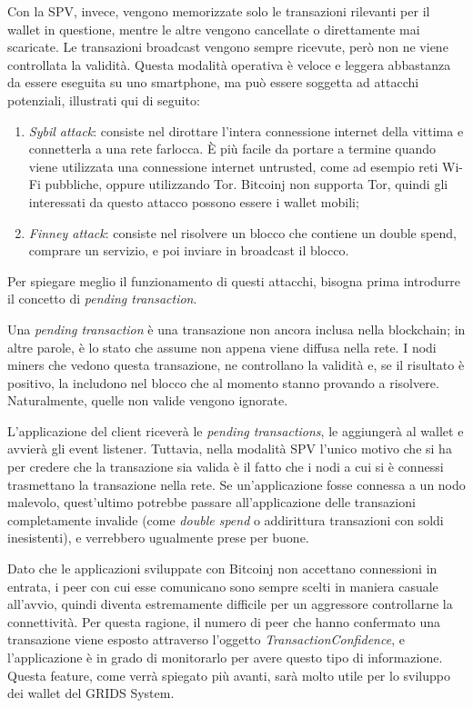 Con la SPV, invece, vengono memorizzate solo le transazioni rilevanti per il wallet in questione, mentre le altre vengono cancellate o direttamente mai scaricate. Le transazioni broadcast vengono sempre ricevute, però non ne viene controllata la validità. Questa modalità operativa è veloce e leggera abbastanza da essere eseguita su uno smartphone, ma può essere soggetta ad attacchi potenziali, illustrati qui di seguito: 

\begin{enumerate}
    \item \textit{Sybil attack}: consiste nel dirottare l'intera connessione internet della vittima e connetterla a una rete farlocca. È più facile da portare a termine quando viene utilizzata una connessione internet untrusted, come ad esempio reti Wi-Fi pubbliche, oppure utilizzando Tor. Bitcoinj non supporta Tor, quindi gli interessati da questo attacco possono essere i wallet mobili; 
    \item \textit{Finney attack}: consiste nel risolvere un blocco che contiene un double spend, comprare un servizio, e poi inviare in broadcast il blocco.
\end{enumerate}

Per spiegare meglio il funzionamento di questi attacchi, bisogna prima introdurre il concetto di \textit{pending transaction}.

Una \textit{pending transaction} è una transazione non ancora inclusa nella blockchain; in altre parole, è lo stato che assume non appena viene diffusa nella rete. I nodi miners che vedono questa transazione, ne controllano la validità e, se il risultato è positivo, la includono nel blocco che al momento stanno provando a risolvere. Naturalmente, quelle non valide vengono ignorate.

L'applicazione del client riceverà le \textit{pending transactions}, le aggiungerà al wallet e avvierà gli event listener. Tuttavia, nella modalità SPV l'unico motivo che si ha per credere che la transazione sia valida è il fatto che i nodi a cui si è connessi trasmettano la transazione nella rete. Se un'applicazione fosse connessa a un nodo malevolo, quest'ultimo potrebbe passare all'applicazione delle transazioni completamente invalide (come \textit{double spend} o addirittura transazioni con soldi inesistenti), e verrebbero ugualmente prese per buone. 

Dato che le applicazioni sviluppate con Bitcoinj non accettano connessioni in entrata, i peer con cui esse comunicano sono sempre scelti in maniera casuale all'avvio, quindi diventa estremamente difficile per un aggressore controllarne la connettività. Per questa ragione, il numero di peer che hanno confermato una transazione viene esposto attraverso l'oggetto \textit{TransactionConfidence}, e l'applicazione è in grado di monitorarlo per avere questo tipo di informazione. Questa feature, come verrà spiegato più avanti, sarà molto utile per lo sviluppo dei wallet del GRIDS System.

